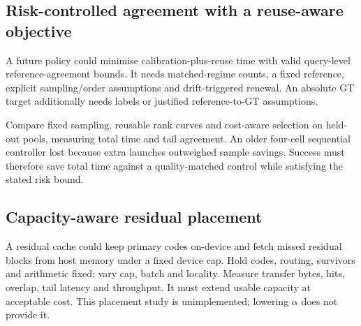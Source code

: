 \subsection{Risk-controlled agreement with a reuse-aware objective}

A future policy could minimise calibration-plus-reuse time with valid query-level reference-agreement bounds. It needs matched-regime counts, a fixed reference, explicit sampling/order assumptions and drift-triggered renewal. An absolute GT target additionally needs labels or justified reference-to-GT assumptions.

Compare fixed sampling, reusable rank curves and cost-aware selection on held-out pools, measuring total time and tail agreement. An older four-cell sequential controller lost because extra launches outweighed sample savings. Success must therefore save total time against a quality-matched control while satisfying the stated risk bound.

\subsection{Capacity-aware residual placement}

A residual cache could keep primary codes on-device and fetch missed residual blocks from host memory under a fixed device cap. Hold codes, routing, survivors and arithmetic fixed; vary cap, batch and locality. Measure transfer bytes, hits, overlap, tail latency and throughput. It must extend usable capacity at acceptable cost. This placement study is unimplemented; lowering $\alpha$ does not provide it.